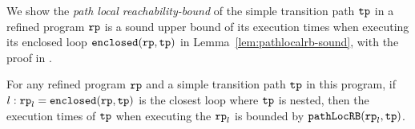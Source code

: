 We show the \emph{path local reachability-bound} of the simple transition path $\mathtt{tp}$ in a refined program $\mathtt{rp}$ is a sound upper bound of its execution times when executing its enclosed loop $\mathtt{enclosed}(\mathtt{rp}, \mathtt{tp})$ in Lemma~\ref{lem:pathlocalrb-sound}, with the proof in .
\begin{lem}
  \label{lem:pathlocalrb-sound}
  For any refined program $\mathtt{rp}$ and a simple transition path $\mathtt{tp}$ in this program,
  if $l: \mathtt{rp}_l = \mathtt{enclosed}(\mathtt{rp}, \mathtt{tp})$ is the closest loop where $\mathtt{tp}$ is nested,
  then the execution times of $\mathtt{tp}$ when executing the $\mathtt{rp}_l$ is bounded by $\mathtt{pathLocRB}(\mathtt{rp}_l, \mathtt{tp})$.
\end{lem}
